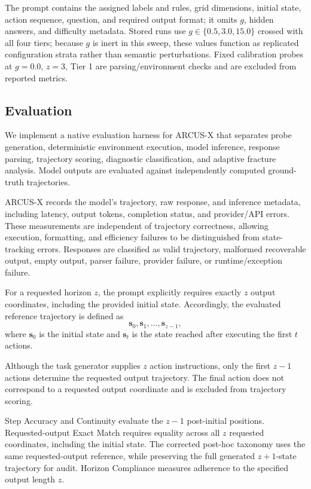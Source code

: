\documentclass{article}
\begin{document}
The prompt contains the assigned labels and rules, grid dimensions, initial state, action sequence, question, and required output format; it omits $g$, hidden answers, and difficulty metadata. Stored runs use $g\in\{0.5,3.0,15.0\}$ crossed with all four tiers; because $g$ is inert in this sweep, these values function as replicated configuration strata rather than semantic perturbations. Fixed calibration probes at $g=0.0$, $z=3$, Tier 1 are parsing/environment checks and are excluded from reported metrics.

\subsection{Evaluation}

We implement a native evaluation harness for ARCUS-X that separates probe generation, deterministic environment execution, model inference, response parsing, trajectory scoring, diagnostic classification, and adaptive fracture analysis. Model outputs are evaluated against independently computed ground-truth trajectories.

ARCUS-X records the model's trajectory, raw response, and inference metadata, including latency, output tokens, completion status, and provider/API errors. These measurements are independent of trajectory correctness, allowing execution, formatting, and efficiency failures to be distinguished from state-tracking errors. Responses are classified as valid trajectory, malformed recoverable output, empty output, parser failure, provider failure, or runtime/exception failure.

For a requested horizon $z$, the prompt explicitly requires
exactly $z$ output coordinates, including the provided initial
state. Accordingly, the evaluated reference trajectory is
defined as
\[
\mathbf{s}_0,\mathbf{s}_1,\ldots,\mathbf{s}_{z-1},
\]
where $\mathbf{s}_0$ is the initial state and $\mathbf{s}_t$
is the state reached after executing the first $t$ actions.

Although the task generator supplies $z$ action instructions,
only the first $z-1$ actions determine the requested output
trajectory. The final action does not correspond to a
requested output coordinate and is excluded from trajectory
scoring.

Step Accuracy and Continuity evaluate the $z-1$ post-initial
positions. Requested-output Exact Match requires equality across all $z$
requested coordinates, including the initial state. The corrected post-hoc
taxonomy uses the same requested-output reference, while preserving the full
generated $z+1$-state trajectory for audit. Horizon Compliance
measures adherence to the specified output length $z$.
\end{document}
